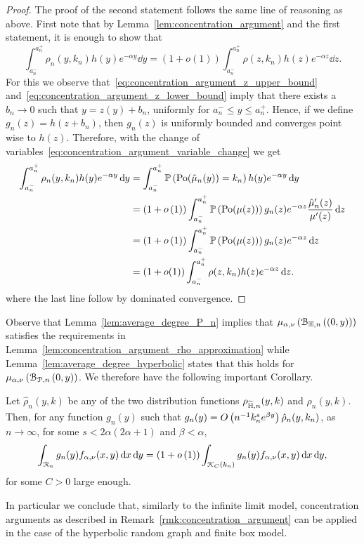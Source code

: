 \begin{proof}
The proof of the second statement follows the same line of reasoning as above. First note that by Lemma~\ref{lem:concentration_argument} and the first statement, it is enough to show that
\[
	\int_{a_n^-}^{a_n^+} \rho_n(y,k_n) h(y) e^{-\alpha y} \dd y
	= \left(1 + o(1)\right) \int_{a_n^-}^{a_n^+} \rho(z,k_n) h(z) e^{-\alpha z} \dd z.
\] 
For this we observe that~\eqref{eq:concentration_argument_z_upper_bound} and~\eqref{eq:concentration_argument_z_lower_bound} imply that there exists a $b_n \to 0$ such that $y = z(y) + b_n$, uniformly for $a_n^- \le y \le a_n^+$. Hence, if we define $g_n(z) = h(z + b_n)$, then $g_n(z)$ is uniformly bounded and converges point wise to $h(z)$. Therefore, with the change of variables~\eqref{eq:concentration_argument_variable_change} we get
\begin{align*}
	\int_{a_n^-}^{a_n^+} \rho_n(y,k_n) h(y) e^{-\alpha y} \operatorname{\mathrm{d}\hspace{-2pt}} y
	&=  \int_{a_n^-}^{a_n^+} \mathbb{P}\left({\mathrm{Po}}(\hat{\mu}_n(y)) = k_n\right) h(y) e^{-\alpha y} \operatorname{\mathrm{d}\hspace{-2pt}} y\\
	&= (1 + o\left(1\right))\int_{a_n^-}^{a_n^+}  \mathbb{P}\left({\mathrm{Po}}(\mu(z))\right)
		g_n(z) e^{-\alpha z} \frac{\hat{\mu}_n^\prime(z)}{\mu^{\prime}(z)} \operatorname{\mathrm{d}\hspace{-2pt}} z\\
	&= (1 + o\left(1\right))\int_{a_n^-}^{a_n^+}  \mathbb{P}\left({\mathrm{Po}}(\mu(z))\right)
		g_n(z) e^{-\alpha z} \operatorname{\mathrm{d}\hspace{-2pt}} z\\
	&= \left(1 + o(1)\right) \int_{a_n^-}^{a_n^+} \rho(z,k_n) h(z) e^{-\alpha z} \operatorname{\mathrm{d}\hspace{-2pt}} z.
\end{align*}
where the last line follow by dominated convergence.
\end{proof}

Observe that Lemma~\ref{lem:average_degree_P_n} implies that $\mu_{\alpha,\nu}\left({\mathcal B}_{\mathbb{H},n}\left((0,y)\right)\right)$ satisfies the requirements in Lemma~\ref{lem:concentration_argument_rho_approximation} while Lemma~\ref{lem:average_degree_hyperbolic} states that this holds for $\mu_{\alpha,\nu}\left({\mathcal B}_{{\mathcal P},n}\left(0,y\right)\right)$. We therefore have the following important Corollary.

\begin{corollary}\label{cor:concentration_argument_other_models}
Let $\hat{\rho}_n(y,k)$ be any of the two distribution functions $\rho_{\widetilde{\mathbb{H}},n}(y,k)$ and $\rho_{n}(y,k)$. Then, for any function $g_n(y)$ such that $g_n(y) = O\left(n^{-1} k_n^{s} e^{\beta y}\right)\hat{\rho}_n(y,k_n)$, as $n \to \infty$, for some $s < 2\alpha(2\alpha + 1)$ and $\beta < \alpha$,
\[
	\int_{{\mathcal R}_n} g_n(y) f_{\alpha,\nu}(x,y) \operatorname{\mathrm{d}\hspace{-2pt}} x \operatorname{\mathrm{d}\hspace{-2pt}} y
	= (1+o\left(1\right))\int_{{\mathcal K}_C(k_n)} g_n(y) f_{\alpha,\nu}(x,y) \operatorname{\mathrm{d}\hspace{-2pt}} x \operatorname{\mathrm{d}\hspace{-2pt}} y,
\]
for some $C > 0$ large enough.
\end{corollary}

In particular we conclude that, similarly to the infinite limit model, concentration arguments as described in Remark~\ref{rmk:concentration_argument} can be applied in the case of the hyperbolic random graph and finite box model.


